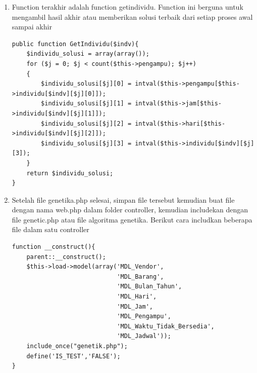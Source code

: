 \begin{enumerate}
	\item Function terakhir adalah function getindividu. Function ini berguna untuk mengambil hasil akhir atau memberikan solusi terbaik dari setiap proses awal sampai akhir
\begin{lstlisting}
public function GetIndividu($indv){
    $individu_solusi = array(array());
    for ($j = 0; $j < count($this->pengampu); $j++)
    {
        $individu_solusi[$j][0] = intval($this->pengampu[$this->individu[$indv][$j][0]]);
        $individu_solusi[$j][1] = intval($this->jam[$this->individu[$indv][$j][1]]);
        $individu_solusi[$j][2] = intval($this->hari[$this->individu[$indv][$j][2]]);       
        $individu_solusi[$j][3] = intval($this->individu[$indv][$j][3]);
    }
    return $individu_solusi;
}
\end{lstlisting}
		
	\item Setelah file genetika.php selesai, simpan file tersebut kemudian buat file dengan nama web.php dalam folder controller, kemudian includekan dengan file genetic.php atau file algoritma genetika. Berikut cara includkan beberapa file dalam satu controller
\begin{lstlisting}
function __construct(){
    parent::__construct();
    $this->load->model(array('MDL_Vendor',
    						 'MDL_Barang',
    						 'MDL_Bulan_Tahun',
    						 'MDL_Hari',
    						 'MDL_Jam',
    						 'MDL_Pengampu',
    						 'MDL_Waktu_Tidak_Bersedia',
    						 'MDL_Jadwal'));
    include_once("genetik.php");
    define('IS_TEST','FALSE');
}
\end{lstlisting}
	

\end{enumerate}
